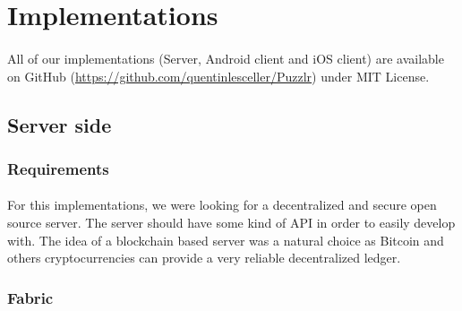 \section{Implementations}
	\paragraph{}
	All of our implementations (Server, Android client and iOS client) are available on GitHub (\url{https://github.com/quentinlesceller/Puzzlr}) under MIT License.
	\subsection{Server side}
 		\subsubsection{Requirements}
 		 	\paragraph{}
 			For this implementations, we were looking for a decentralized and secure open source server. The server should have some kind of API in order to easily develop with. The idea of a blockchain based server was a natural choice as Bitcoin and others cryptocurrencies can provide a very reliable decentralized ledger.
 			\subsubsection{Fabric} 
